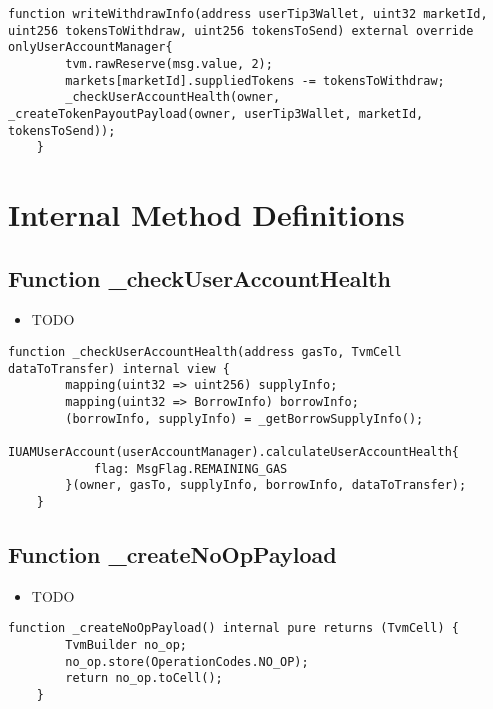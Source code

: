 \begin{lstlisting}[firstnumber=160]
    function writeWithdrawInfo(address userTip3Wallet, uint32 marketId, uint256 tokensToWithdraw, uint256 tokensToSend) external override onlyUserAccountManager{
        tvm.rawReserve(msg.value, 2);
        markets[marketId].suppliedTokens -= tokensToWithdraw;
        _checkUserAccountHealth(owner, _createTokenPayoutPayload(owner, userTip3Wallet, marketId, tokensToSend));
    }
\end{lstlisting}

\section{Internal Method Definitions}


\subsection{Function \_{}checkUserAccountHealth}

\noindent\begin{itemize}
\item TODO
\end{itemize}

\begin{lstlisting}[firstnumber=257]
    function _checkUserAccountHealth(address gasTo, TvmCell dataToTransfer) internal view {
        mapping(uint32 => uint256) supplyInfo;
        mapping(uint32 => BorrowInfo) borrowInfo;
        (borrowInfo, supplyInfo) = _getBorrowSupplyInfo();
        IUAMUserAccount(userAccountManager).calculateUserAccountHealth{
            flag: MsgFlag.REMAINING_GAS
        }(owner, gasTo, supplyInfo, borrowInfo, dataToTransfer);
    }
\end{lstlisting}

\subsection{Function \_{}createNoOpPayload}

\noindent\begin{itemize}
\item TODO
\end{itemize}

\begin{lstlisting}[firstnumber=373]
    function _createNoOpPayload() internal pure returns (TvmCell) {
        TvmBuilder no_op;
        no_op.store(OperationCodes.NO_OP);
        return no_op.toCell();
    }
\end{lstlisting}

